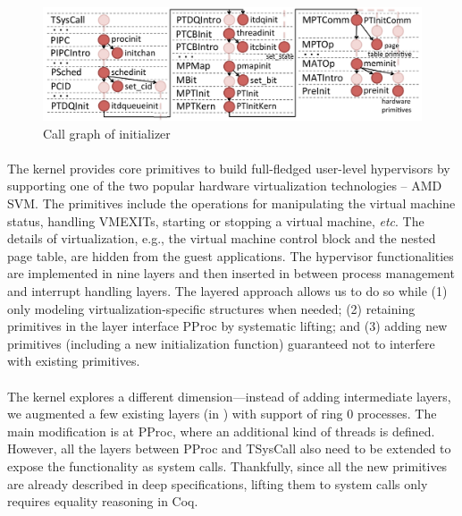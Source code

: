 \begin{figure}
\center
\includegraphics[scale=0.3]{figs/initialization}
\caption{Call graph of \mCTOSbase{} initializer}
\label{fig:mcertikos-init-call-graph}
\end{figure}

\paragraph{\mCTOShyper{}}
The \mCTOShyper{} kernel provides core primitives to build
full-fledged user-level hypervisors by supporting one of the two
popular hardware virtualization technologies -- AMD SVM.  The primitives
include the operations for manipulating the virtual machine status,
handling VMEXITs, starting or stopping a virtual machine, {\it etc}.
The details of virtualization, e.g., the virtual machine control block
and the nested page table, are hidden from the guest applications.
The hypervisor functionalities are implemented in nine layers and then
inserted in between process management and interrupt handling layers.
The layered approach allows us to do so while (1) only modeling
virtualization-specific structures when needed; (2) retaining
primitives in the layer interface \textsf{PProc} by systematic lifting; and
(3) adding new primitives (including a new initialization function)
guaranteed not to interfere with existing primitives.

\paragraph{\mCTOSringz{}}
The \mCTOSringz{} kernel explores a different dimension---instead
of adding intermediate layers, we augmented a few existing layers 
(in \mCTOShyper{}) with support of ring 0 processes.
The main modification is at
\textsf{PProc}, where an additional kind of threads is defined.
However, all the layers between \textsf{PProc} and \textsf{TSysCall} also
need to be extended to expose the functionality as system calls.
Thankfully, since all the new primitives are already described in deep
specifications, lifting them to system calls only requires equality
reasoning in Coq.

